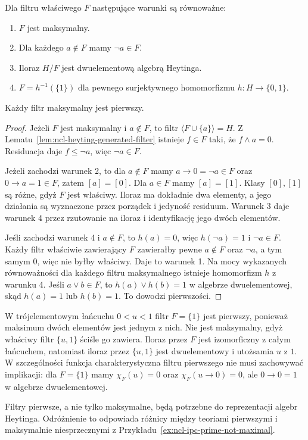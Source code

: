 \begin{twierdzenie}
\label{thm:ncl-heyting-maximal-filters}
Dla filtru właściwego $F$ następujące warunki
są równoważne:
\begin{enumerate}
\item $F$ jest maksymalny.
\item Dla każdego $a\notin F$ mamy $\neg a\in F$.
\item Iloraz $H/F$ jest dwuelementową algebrą
      Heytinga.
\item $F=h^{-1}(\{1\})$ dla pewnego surjektywnego
      homomorfizmu $h:H\to\{0,1\}$.
\end{enumerate}
Każdy filtr maksymalny jest pierwszy.
\end{twierdzenie}
\begin{proof}
Jeżeli $F$ jest maksymalny i $a\notin F$,
to filtr $\langle F\cup\{a\}\rangle=H$.
Z Lematu~\ref{lem:ncl-heyting-generated-filter}
istnieje $f\in F$ taki, że $f\wedge a=0$.
Residuacja daje $f\leq\neg a$, więc $\neg a\in F$.

Jeżeli zachodzi warunek 2, to dla $a\notin F$
mamy $a\to0=\neg a\in F$ oraz $0\to a=1\in F$,
zatem $[a]=[0]$. Dla $a\in F$ mamy $[a]=[1]$.
Klasy $[0],[1]$ są różne, gdyż $F$ jest właściwy.
Iloraz ma dokładnie dwa elementy, a jego działania
są wyznaczone przez porządek i jedyność residuum.
Warunek 3 daje warunek 4 przez rzutowanie
na iloraz i identyfikację jego dwóch elementów.

Jeśli zachodzi warunek 4 i $a\notin F$, to
$h(a)=0$, więc $h(\neg a)=1$ i $\neg a\in F$.
Każdy filtr właściwie zawierający $F$ zawierałby
pewne $a\notin F$ oraz $\neg a$, a tym samym $0$,
więc nie byłby właściwy. Daje to warunek 1.
Na mocy wykazanych równoważności dla każdego
filtru maksymalnego istnieje homomorfizm $h$
z warunku 4. Jeśli $a\vee b\in F$, to
$h(a)\vee h(b)=1$ w algebrze dwuelementowej,
skąd $h(a)=1$ lub $h(b)=1$.
To dowodzi pierwszości.
\end{proof}

\begin{przyklad}
\label{ex:ncl-heyting-prime-nonmaximal}
W trójelementowym łańcuchu $0<u<1$ filtr
$F=\{1\}$ jest pierwszy, ponieważ maksimum
dwóch elementów jest jednym z nich.
Nie jest maksymalny, gdyż właściwy filtr
$\{u,1\}$ ściśle go zawiera.
Iloraz przez $F$ jest izomorficzny z całym
łańcuchem, natomiast iloraz przez $\{u,1\}$
jest dwuelementowy i utożsamia $u$ z $1$.
W szczególności funkcja charakterystyczna
filtru pierwszego nie musi zachowywać implikacji:
dla $F=\{1\}$ mamy
$\chi_F(u)=0$ oraz $\chi_F(u\to0)=0$,
ale $0\to0=1$ w algebrze dwuelementowej.
\end{przyklad}
Filtry pierwsze, a nie tylko maksymalne, będą
potrzebne do reprezentacji algebr Heytinga.
Odróżnienie to odpowiada różnicy między teoriami
pierwszymi i maksymalnie niesprzecznymi z
Przykładu~\ref{ex:ncl-ipc-prime-not-maximal}.

